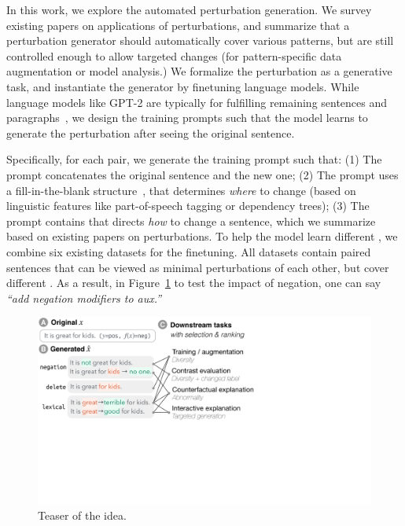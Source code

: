In this work, we explore the automated perturbation generation.
We survey existing papers on applications of perturbations, and summarize that a perturbation generator should automatically cover various patterns, but are still controlled enough to allow targeted changes (for pattern-specific data augmentation or model analysis.)
We formalize the perturbation as a generative task, and instantiate the generator by finetuning language models.
While language models like GPT-2 are typically for fulfilling remaining sentences and paragraphs~\cite{radford2019language}, we design the training prompts such that the model learns to generate the perturbation after seeing the original sentence.

Specifically, for each pair, we generate the training prompt such that:
(1) The prompt concatenates the original sentence and the new one;  
(2) The prompt uses a fill-in-the-blank structure~\cite{donahue2020enabling}, that determines \emph{where} to change (based on linguistic features like part-of-speech tagging or dependency trees);
(3) The prompt contains \tagstrs that directs \emph{how} to change a sentence, which we summarize based on existing papers on perturbations.
To help the model learn different \tagstrs, we combine six existing datasets for the finetuning.
All datasets contain paired sentences that can be viewed as minimal perturbations of each other, but cover different \tagstrs.
As a result, in Figure~\ref{fig:teaser} to test the impact of negation, one can say \emph{``add negation modifiers to aux.''}

\begin{figure}[t]
\centering
\includegraphics[trim={0 17cm 23cm 0cm},clip, width=1\columnwidth]{figures/teaser}
\vspace{-15pt}
\caption{Teaser of the idea. }
\vspace{-10pt}
\label{fig:teaser}
\end{figure} 
 

